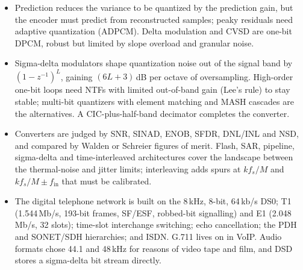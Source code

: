 \begin{itemize}
$\mu$-law ($\mu=255$) and A-law ($A=87.6$) are binary-friendly chord approximations that give
8-bit codes the small-signal resolution of 13- and 12-bit uniform quantizers, about 36--38\,dB of
SQNR over 40\,dB of level, and define the 64\,kb/s channel.
\item Prediction reduces the variance to be quantized by the prediction gain, but the encoder must
predict from reconstructed samples; peaky residuals need adaptive quantization (ADPCM). Delta
modulation and CVSD are one-bit DPCM, robust but limited by slope overload and granular noise.
\item Sigma-delta modulators shape quantization noise out of the signal band by
$(1-z^{-1})^L$, gaining $(6L+3)$\,dB per octave of oversampling. High-order one-bit loops need
NTFs with limited out-of-band gain (Lee's rule) to stay stable; multi-bit quantizers with
element matching and MASH cascades are the alternatives. A CIC-plus-half-band decimator completes
the converter.
\item Converters are judged by SNR, SINAD, ENOB, SFDR, DNL/INL and NSD, and compared by Walden or
Schreier figures of merit. Flash, SAR, pipeline, sigma-delta and time-interleaved architectures
cover the landscape between the thermal-noise and jitter limits; interleaving adds spurs at
$kf_s/M$ and $kf_s/M\pm f_{\text{in}}$ that must be calibrated.
\item The digital telephone network is built on the 8\,kHz, 8-bit, 64\,kb/s DS0; T1 (1.544\,Mb/s,
193-bit frames, SF/ESF, robbed-bit signalling) and E1 (2.048\,Mb/s, 32 slots); time-slot
interchange switching; echo cancellation; the PDH and SONET/SDH hierarchies; and ISDN. G.711 lives
on in VoIP. Audio formats chose 44.1 and 48\,kHz for reasons of video tape and film, and DSD
stores a sigma-delta bit stream directly.
\end{itemize}


